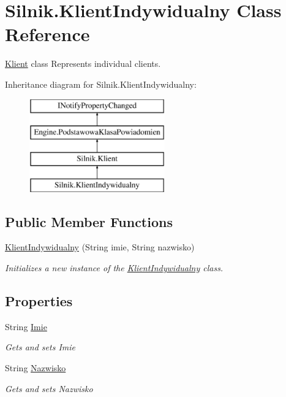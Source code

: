 \hypertarget{class_silnik_1_1_klient_indywidualny}{}\section{Silnik.\+Klient\+Indywidualny Class Reference}
\label{class_silnik_1_1_klient_indywidualny}


\mbox{\hyperlink{class_silnik_1_1_klient}{Klient}} class Represents individual clients.  


Inheritance diagram for Silnik.\+Klient\+Indywidualny\+:\begin{figure}[H]
\begin{center}
\leavevmode
\includegraphics[height=4.000000cm]{class_silnik_1_1_klient_indywidualny}
\end{center}
\end{figure}
\subsection*{Public Member Functions}
\begin{DoxyCompactItemize}
\item 
\mbox{\hyperlink{class_silnik_1_1_klient_indywidualny_aad71a96b2d0b01f88f7a4f409f43f28b}{Klient\+Indywidualny}} (String imie, String nazwisko)
\begin{DoxyCompactList}\small\item\em Initializes a new instance of the \mbox{\hyperlink{class_silnik_1_1_klient_indywidualny}{Klient\+Indywidualny}} class. \end{DoxyCompactList}\end{DoxyCompactItemize}
\subsection*{Properties}
\begin{DoxyCompactItemize}
\item 
String \mbox{\hyperlink{class_silnik_1_1_klient_indywidualny_a91475465ea4c5df8a30690dd5d7cee94}{Imie}}
\begin{DoxyCompactList}\small\item\em Gets and sets Imie \end{DoxyCompactList}\item 
String \mbox{\hyperlink{class_silnik_1_1_klient_indywidualny_ab5a0bdb5ed8412c91aeccb2833996607}{Nazwisko}}
\begin{DoxyCompactList}\small\item\em Gets and sets Nazwisko \end{DoxyCompactList}\end{DoxyCompactItemize}
